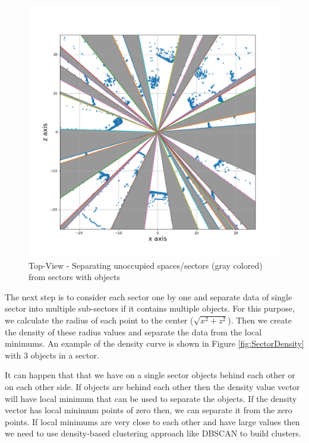 \begin{figure}[!h]
\begin{minipage}{0.40\textwidth}
        \includegraphics[scale=0.3]{./images/sector-transforms/scene-with-sector.pdf}
        \caption{Top-View - Separating unoccupied spaces/sectors (gray colored) from sectors with objects}
        \label{fig:sectors2}
\end{minipage}%
\end{figure}
The next step is to consider each sector one by one and separate data of single sector into multiple
sub-sectors if it contains multiple objects. For this purpose, we calculate the radius of each
point to the center ($\sqrt{x^2 + z^2 } $).
Then we create the density of these radius values and separate the data from the local minimums.  
An example of the density curve is shown in Figure \ref{fig:SectorDensity} with 3 objects in a
sector.

It can happen that that we have on a single sector objects behind each other or on each other side. 
If objects are behind each other then the density value vector will have local minimum that can
be used to separate the objects. If the density vector has local minimum points of zero then, we can separate it from the zero
points. If local minimums are very close to each other and have large values then we need to
use density-based clustering approach like DBSCAN to build clusters.



